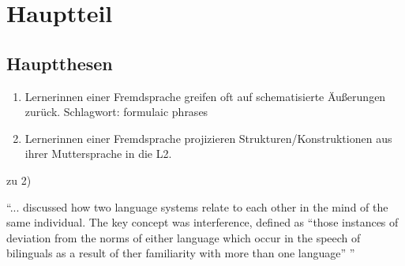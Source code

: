 \section{Hauptteil}

\subsection{Hauptthesen}
\begin{enumerate}
    \item Lernerinnen einer Fremdsprache greifen oft auf schematisierte Äußerungen zurück.
Schlagwort: formulaic phrases
    \item Lernerinnen einer Fremdsprache projizieren Strukturen/Konstruktionen aus ihrer Muttersprache in die L2.
\end{enumerate}


zu 2)

\cite{Weinreich79} ``... discussed how two language systems relate to each other in the mind of the same individual.
The key concept was interference, defined as ``those instances of deviation from the norms of either language which occur in the speech of bilinguals as a result of ther familiarity with more than one language'' \cite{Weinreich79} '' \cite{Cook93}

